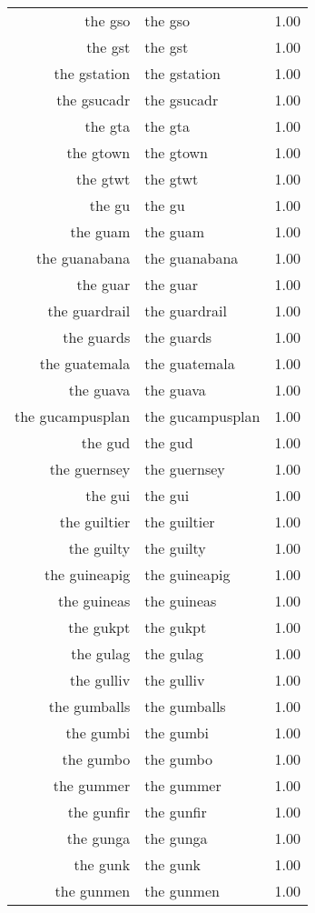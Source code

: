 \begin{table}[ht]
\begin{tabular}{rlr}
  the gso & the gso & 1.00 \\ 
  the gst & the gst & 1.00 \\ 
  the gstation & the gstation & 1.00 \\ 
  the gsucadr & the gsucadr & 1.00 \\ 
  the gta & the gta & 1.00 \\ 
  the gtown & the gtown & 1.00 \\ 
  the gtwt & the gtwt & 1.00 \\ 
  the gu & the gu & 1.00 \\ 
  the guam & the guam & 1.00 \\ 
  the guanabana & the guanabana & 1.00 \\ 
  the guar & the guar & 1.00 \\ 
  the guardrail & the guardrail & 1.00 \\ 
  the guards & the guards & 1.00 \\ 
  the guatemala & the guatemala & 1.00 \\ 
  the guava & the guava & 1.00 \\ 
  the gucampusplan & the gucampusplan & 1.00 \\ 
  the gud & the gud & 1.00 \\ 
  the guernsey & the guernsey & 1.00 \\ 
  the gui & the gui & 1.00 \\ 
  the guiltier & the guiltier & 1.00 \\ 
  the guilty & the guilty & 1.00 \\ 
  the guineapig & the guineapig & 1.00 \\ 
  the guineas & the guineas & 1.00 \\ 
  the gukpt & the gukpt & 1.00 \\ 
  the gulag & the gulag & 1.00 \\ 
  the gulliv & the gulliv & 1.00 \\ 
  the gumballs & the gumballs & 1.00 \\ 
  the gumbi & the gumbi & 1.00 \\ 
  the gumbo & the gumbo & 1.00 \\ 
  the gummer & the gummer & 1.00 \\ 
  the gunfir & the gunfir & 1.00 \\ 
  the gunga & the gunga & 1.00 \\ 
  the gunk & the gunk & 1.00 \\ 
  the gunmen & the gunmen & 1.00 \\ 

\end{tabular}
\end{table}
